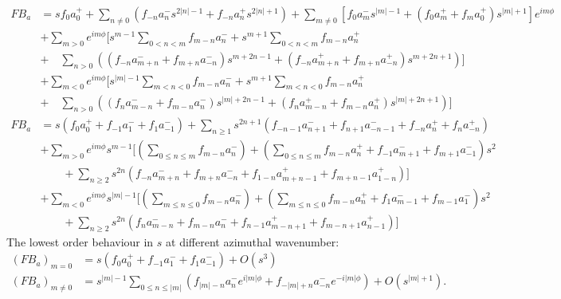 \documentclass[a4paper, 11pt]{article}
\begin{document}
\begin{equation}
\begin{aligned}
    F B_a &= s f_0 a_0^+ + \sum_{n\neq 0} \left(f_{-n} a_n^- s^{2|n|-1} + f_{-n} a_n^+ s^{2|n|+1}\right) + \sum_{m\neq 0} \left[f_0 a_{m}^- s^{|m|-1} + \left(f_0 a_m^+ + f_m a_0^+\right) s^{|m|+1}\right] e^{im\phi} \\
    &+ \sum_{m > 0} e^{im\phi} \Bigg[s^{m-1} \sum_{0<n<m} f_{m-n} a_n^- + s^{m+1} \sum_{0<n<m} f_{m-n} a_n^+ \\
    &+\quad  \sum_{n>0} \left(\left(f_{-n} a_{m+n}^- + f_{m+n} a_{-n}^- \right) s^{m+2n-1} + \left(f_{-n} a_{m+n}^+ + f_{m+n} a_{-n}^+ \right) s^{m+2n+1} \right) \Bigg] \\
    &+ \sum_{m < 0} e^{im\phi} \Bigg[s^{|m|-1} \sum_{m<n<0} f_{m-n} a_n^- + s^{m+1} \sum_{m<n<0} f_{m-n} a_n^+ \\
    &+\quad  \sum_{n>0} \left(\left(f_{n} a_{m-n}^- + f_{m-n} a_{n}^- \right) s^{|m|+2n-1} + \left(f_{n} a_{m-n}^+ + f_{m-n} a_{n}^+ \right) s^{|m|+2n+1} \right) \Bigg] \\
    F B_a &= s \left(f_0 a_0^+ + f_{-1} a_1^- + f_1 a_{-1}^-\right) + \sum_{n\geq 1} s^{2n+1} \left(f_{-n-1} a_{n+1}^- + f_{n+1} a_{-n-1}^- + f_{-n} a_n^+ + f_n a_{-n}^+ \right) \\
    &+ \sum_{m > 0} e^{im\phi} s^{m-1} \Bigg[ \left(\sum_{0\leq n\leq m} f_{m-n} a_n^-\right) + \left(\sum_{0\leq n\leq m} f_{m-n} a_n^+ + f_{-1}a_{m+1}^- + f_{m+1} a_{-1}^- \right) s^2 \\
    &\qquad + \sum_{n\geq 2} s^{2n} \left(f_{-n} a_{m+n}^- + f_{m+n} a_{-n}^- + f_{1-n} a_{m+n-1}^+ + f_{m+n-1} a_{1-n}^+\right) \Bigg] \\ 
    &+ \sum_{m < 0} e^{im\phi} s^{|m|-1} \Bigg[ \left(\sum_{m\leq n\leq 0} f_{m-n} a_n^-\right) + \left(\sum_{m\leq n\leq 0} f_{m-n} a_n^+ + f_{1}a_{m-1}^- + f_{m-1} a_{1}^- \right) s^2 \\
    &\qquad + \sum_{n\geq 2} s^{2n} \left(f_{n} a_{m-n}^- + f_{m-n} a_{n}^- + f_{n-1} a_{m-n+1}^+ + f_{m-n+1} a_{n-1}^+\right) \Bigg]
\end{aligned}
\end{equation}
The lowest order behaviour in $s$ at different azimuthal wavenumber:
\begin{equation}
\begin{aligned}
    (FB_a)_{m=0} &= s \left(f_0 a_0^+ + f_{-1} a_1^- + f_1 a_{-1}^-\right) + O(s^3) \\ 
    (FB_a)_{m\neq 0} &= s^{|m|-1} \sum_{0\leq n \leq |m|} \left( f_{|m|-n} a_n^- e^{i|m|\phi} + f_{-|m|+n} a_{-n}^- e^{-i|m|\phi}\right) + O(s^{|m|+1}).
\end{aligned}
\end{equation}
\end{document}
